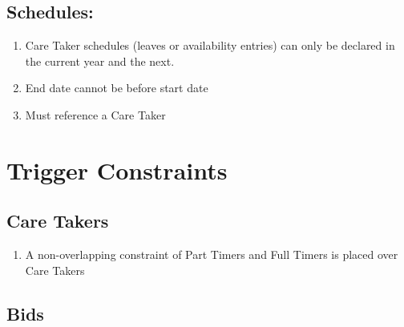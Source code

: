\documentclass[
  paper=a4,
  ,captions=tableheading
]{scrartcl}
\providecommand{\tightlist}{%
  \setlength{\itemsep}{0pt}\setlength{\parskip}{0pt}}
\begin{document}
\hypertarget{schedules}{%
\subsection{Schedules:}\label{schedules}}

\begin{enumerate}
\def\labelenumi{\arabic{enumi}.}
\tightlist
\item
  Care Taker schedules (leaves or availability entries) can only be
  declared in the current year and the next.
\item
  End date cannot be before start date
\item
  Must reference a Care Taker
\end{enumerate}

\hypertarget{trigger-constraints}{%
\section{Trigger Constraints}\label{trigger-constraints}}

\hypertarget{care-takers-1}{%
\subsection{Care Takers}\label{care-takers-1}}

\begin{enumerate}
\def\labelenumi{\arabic{enumi}.}
\setcounter{enumi}{3}
\tightlist
\item
  A non-overlapping constraint of Part Timers and Full Timers is placed
  over Care Takers
\end{enumerate}

\hypertarget{bids-1}{%
\subsection{Bids}\label{bids-1}}
\end{document}

